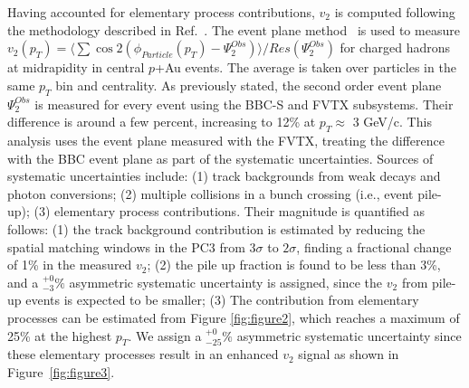 \documentclass[%
reprint,
showpacs,preprintnumbers,
 amsmath,amssymb,
 aps,
]{revtex4-1}
\newcommand{\pt}{\mbox{$p_T$}\xspace}
\newcommand{\pau}{\mbox{$p$+Au}\xspace}
\begin{document}
Having accounted for elementary process contributions, $v_2$ is computed following the methodology described in Ref.~\cite{Adare:2015ctn}. The event plane method~\cite{ep} is used to measure $v_{2}(p_{T}) = \langle\sum \cos 2(\phi_{Particle}(p_{T})-\Psi^{Obs}_{2})\rangle/Res(\Psi^{Obs}_{2})$ for charged hadrons at midrapidity in central \pau events. The average is taken over particles in the same \pt bin and centrality.
As previously stated, the second order event plane $\Psi^{Obs}_{2}$ is measured for every event using the BBC-S and FVTX subsystems. Their difference is around a few percent, increasing to 12\% at $p_T\approx$ 3 GeV/c. This analysis uses the event plane measured with the FVTX, treating the difference with the BBC event plane as part of the systematic uncertainties. Sources of systematic uncertainties include: (1) track backgrounds from weak decays and photon conversions; (2) multiple collisions in a bunch crossing (i.e., event pile-up); (3) elementary process contributions. Their magnitude is quantified as follows: (1) the track background contribution is estimated by reducing the spatial matching windows in the PC3 from $3\sigma$ to $2\sigma$, finding a fractional change of 1\% in the measured $v_{2}$; (2) the pile up fraction is found to be less than 3\%, and a $^{+0}_{-3}\%$ asymmetric systematic uncertainty is assigned, since the $v_{2}$ from pile-up events is expected to be smaller; (3) The contribution from elementary processes can be estimated from Figure \ref{fig:figure2}, which reaches a maximum of 25\% at the highest $p_T$. We assign a $^{+0}_{-25}\%$ asymmetric systematic uncertainty since these elementary processes result in an enhanced $v_2$ signal as shown in Figure~\ref{fig:figure3}.
\end{document}
